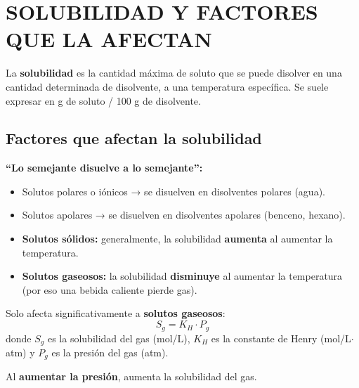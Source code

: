 \documentclass[11pt,a4paper]{article}
\begin{document}
\newpage
\section{SOLUBILIDAD Y FACTORES QUE LA AFECTAN}

\begin{tcolorbox}[definicion, title=Solubilidad]
La \textbf{solubilidad} es la cantidad máxima de soluto que se puede disolver en una cantidad determinada de disolvente, a una temperatura específica. Se suele expresar en g de soluto / 100 g de disolvente.
\end{tcolorbox}

\subsection{Factores que afectan la solubilidad}

\begin{tcolorbox}[propiedad, title=Factor 1: Naturaleza del soluto y disolvente]
\textbf{``Lo semejante disuelve a lo semejante'':}
\begin{itemize}[nosep]
  \item Solutos polares o iónicos → se disuelven en disolventes polares (agua).
  \item Solutos apolares → se disuelven en disolventes apolares (benceno, hexano).
\end{itemize}
\end{tcolorbox}

\begin{tcolorbox}[propiedad, title=Factor 2: Temperatura]
\begin{itemize}[nosep]
  \item \textbf{Solutos sólidos:} generalmente, la solubilidad \textbf{aumenta} al aumentar la temperatura.
  \item \textbf{Solutos gaseosos:} la solubilidad \textbf{disminuye} al aumentar la temperatura (por eso una bebida caliente pierde gas).
\end{itemize}
\end{tcolorbox}

\begin{tcolorbox}[propiedad, title=Factor 3: Presión (Ley de Henry)]
Solo afecta significativamente a \textbf{solutos gaseosos}:
\[ S_g = K_H \cdot P_g \]
donde $S_g$ es la solubilidad del gas (mol/L), $K_H$ es la constante de Henry (mol/L$\cdot$atm) y $P_g$ es la presión del gas (atm).

Al \textbf{aumentar la presión}, aumenta la solubilidad del gas.
\end{tcolorbox}
\end{document}
